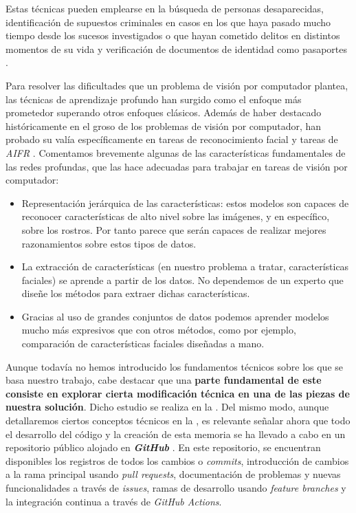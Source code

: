 Estas técnicas pueden emplearse en la búsqueda de personas desaparecidas, identificación de supuestos criminales en casos en los que haya pasado mucho tiempo desde los sucesos investigados o que hayan cometido delitos en distintos momentos de su vida y verificación de documentos de identidad como pasaportes \cite{informatica:aifr_survey}.

Para resolver las dificultades que un problema de visión por computador plantea, las técnicas de aprendizaje profundo han surgido como el enfoque más prometedor superando otros enfoques clásicos. Además de haber destacado históricamente en el groso de los problemas de visión por computador, han probado su valía específicamente en tareas de reconocimiento facial \cite{informatica:deep_fr_survey} y tareas de \textit{AIFR} \cite{informatica:aifr_survey}. Comentamos brevemente algunas de las características fundamentales de las redes profundas, que las hace adecuadas para trabajar en tareas de visión por computador:

\begin{itemize}
	\item Representación jerárquica de las características: estos modelos son capaces de reconocer características de alto nivel sobre las imágenes, y en específico, sobre los rostros. Por tanto parece que serán capaces de realizar mejores razonamientos sobre estos tipos de datos.
	\item La extracción de características (en nuestro problema a tratar, características faciales) se aprende a partir de los datos. No dependemos de un experto que diseñe los métodos para extraer dichas características.
	\item Gracias al uso de grandes conjuntos de datos podemos aprender modelos mucho más expresivos que con otros métodos, como por ejemplo, comparación de características faciales diseñadas a mano.
\end{itemize}

Aunque todavía no hemos introducido los fundamentos técnicos sobre los que se basa nuestro trabajo, cabe destacar que una \textbf{parte fundamental de este consiste en explorar cierta modificación técnica en una de las piezas de nuestra solución}. Dicho estudio se realiza en la . Del mismo modo, aunque detallaremos ciertos conceptos técnicos en la , es relevante señalar ahora que todo el desarrollo del código y la creación de esta memoria se ha llevado a cabo en un repositorio público alojado en \textbf{\textit{GitHub}} \cite{informatica:repogithub}. En este repositorio, se encuentran disponibles los registros de todos los cambios o \textit{commits}, introducción de cambios a la rama principal usando \textit{pull requests}, documentación de problemas y nuevas funcionalidades a través de \textit{issues}, ramas de desarrollo usando \textit{feature branches} y la integración continua a través de \textit{GitHub Actions}.

